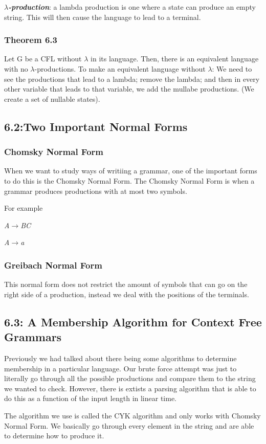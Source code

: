 \documentclass{article}
\begin{document}
\textbf{\textit{$\lambda$-production}}: a lambda production is one where a state can produce an empty string. This will
then cause the language to lead to a terminal.
\subsubsection{Theorem 6.3}
Let G be a CFL without $\lambda$ in its language. Then, there is an equivalent  language with no $\lambda$-productions.
To make an equivalent language without $\lambda$: We need to see the productions that lead to a lambda; remove the lambda;
and then in every other variable that leads to that  variable, we add the mullabe productions. 
(We create a set of nullable states).
\subsection{6.2:Two Important Normal Forms}
\subsubsection{Chomsky Normal Form}
When we want to study ways of writiing  a grammar, one of the important forms to do this is the Chomsky Normal Form.
The Chomsky Normal Form is when a grammar produces productions with at most two symbols.

For example

\textit{A$\rightarrow$BC} 

\textit{A$\rightarrow$a}
\subsubsection{Greibach Normal Form}
This normal form does not restrict the amount of symbols that can go on the right side of a production, instead 
we deal with the positions of the terminals.
\subsection{6.3: A Membership Algorithm for Context Free Grammars}
Previously we had talked about there being some algorithms to determine membership in a particular language.
Our brute force attempt was just to literally go through all the possible productions and compare them to the 
string we wanted to check. However, there is extists a parsing algorithm that is able to do this as a function 
of the input length in linear time.

The algorithm we use is called the CYK algorithm and only works with Chomsky Normal Form. We basically go through 
every element in the string and are able to determine how to produce it.
\end{document}
